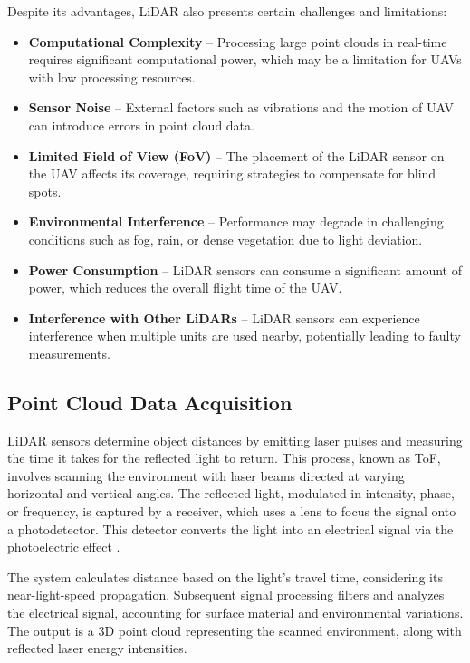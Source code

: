             Despite its advantages, \ac{LiDAR} also presents certain challenges and limitations:  
            \begin{itemize}  
                \item \textbf{Computational Complexity} -- Processing large point clouds in real-time requires significant computational power, which may be a limitation for \ac{UAV}s with low processing resources.
                \item \textbf{Sensor Noise} -- External factors such as vibrations and the motion of \ac{UAV} can introduce errors in point cloud data.  
                \item \textbf{Limited Field of View (FoV)} -- The placement of the \ac{LiDAR} sensor on the \ac{UAV} affects its coverage, requiring strategies to compensate for blind spots.  
                \item \textbf{Environmental Interference} -- Performance may degrade in challenging conditions such as fog, rain, or dense vegetation due to light deviation.  
                \item \textbf{Power Consumption} -- \ac{LiDAR} sensors can consume a significant amount of power, which reduces the overall flight time of the \ac{UAV}.
                \item \textbf{Interference with Other LiDARs} -- \ac{LiDAR} sensors can experience interference when multiple units are used nearby, potentially leading to faulty measurements.
            \end{itemize}

        \subsection{Point Cloud Data Acquisition}
            \ac{LiDAR} sensors determine object distances by emitting laser pulses and measuring the time it takes for the reflected light to return. 
            This process, known as \ac{ToF}, involves scanning the environment with laser beams directed at varying horizontal and vertical angles. 
            The reflected light, modulated in intensity, phase, or frequency, is captured by a receiver, which uses a lens to focus the signal onto a photodetector. 
            This detector converts the light into an electrical signal via the photoelectric effect \cite{lidar_how_works}.

            The system calculates distance based on the light's travel time, considering its near-light-speed propagation. 
            Subsequent signal processing filters and analyzes the electrical signal, accounting for surface material and environmental variations. 
            The output is a 3D point cloud representing the scanned environment, along with reflected laser energy intensities. 


